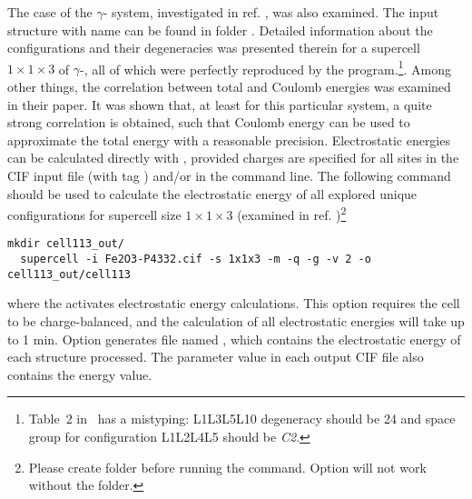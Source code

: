 \documentclass[a4paper,10pt]{article}
\begin{document}
The case of the $\gamma$- system, investigated in ref. \cite{Grau2010}, was also examined. The input structure with name  can be found in folder . Detailed information about the configurations and their degeneracies was presented therein for a supercell $1\times1\times3$ of $\gamma$-, all of which were perfectly reproduced by the \sups{} program.\footnote{Table~2 in~\cite{Grau2010} has a mistyping: L1L3L5L10 degeneracy should be 24 and space group for configuration L1L2L4L5 should be \textit{C2}.}. Among other things, the correlation between total and Coulomb energies was examined in their paper. It was shown that, at least for this particular system, a quite strong correlation is obtained, such that Coulomb energy can be used to approximate the total energy with a reasonable precision. Electrostatic energies can be calculated directly with \sups{}, provided charges are specified for all sites in the CIF input file (with tag ) and/or in the command line. The following command should be used to calculate the electrostatic energy of all explored unique configurations for supercell size $1\times1\times3$ (examined in ref. \cite{Grau2010})\footnote{Please create folder  before running the command. Option  will not work without the folder.}
\begin{Verbatim}[breaklines]
  mkdir cell113_out/
  supercell -i Fe2O3-P4332.cif -s 1x1x3 -m -q -g -v 2 -o cell113_out/cell113 
\end{Verbatim}
where the  activates electrostatic energy calculations. This option requires the cell to be charge-balanced, and the calculation of all electrostatic energies will take up to 1 min. Option  generates file named , which contains the electrostatic energy of each structure processed. The  parameter value in each output CIF file also contains the energy value.
\end{document}
